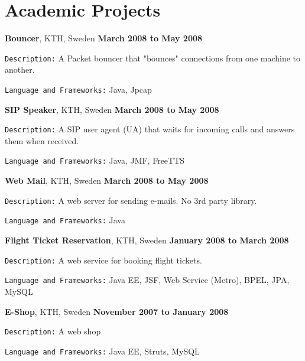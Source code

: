 \section{Academic Projects}
\textbf{Bouncer}, KTH, Sweden \hfill \textbf{March 2008 to May 2008}
\begin{innerlist}
\item \texttt{Description:}
A Packet bouncer that "bounces" connections from one machine to another.
\item \texttt{Language and Frameworks:}
Java, Jpcap
\end{innerlist}

\blankline

\textbf{SIP Speaker}, KTH, Sweden \hfill \textbf{March 2008 to May 2008}
\begin{outerlist}
\item \texttt{Description:}
A SIP user agent (UA) that waits for incoming calls and answers them when received.
\item \texttt{Language and Frameworks:}
Java, JMF, FreeTTS
\end{outerlist}

\blankline

\textbf{Web Mail}, KTH, Sweden \hfill \textbf{March 2008 to May 2008}
\begin{outerlist}
\item \texttt{Description:}
A web server for sending e-mails. No 3rd party library.
\item \texttt{Language and Frameworks:}
Java
\end{outerlist}

\blankline

\textbf{Flight Ticket Reservation}, KTH, Sweden \hfill \textbf{January 2008 to March 2008}
\begin{outerlist}
\item \texttt{Description:}
A web service for booking flight tickets.
\item \texttt{Language and Frameworks:}
Java EE, JSF, Web Service (Metro), BPEL, JPA, MySQL 
\end{outerlist}

\blankline

\textbf{E-Shop}, KTH, Sweden \hfill \textbf{November 2007 to January 2008}
\begin{outerlist}
\item \texttt{Description:}
A web shop
\item \texttt{Language and Frameworks:}
Java EE, Struts, MySQL
\end{outerlist}

